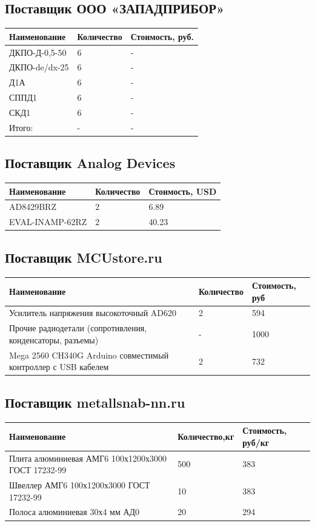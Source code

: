 \documentclass[11pt]{report}
\begin{document}
\subsection{Поставщик ООО «ЗАПАДПРИБОР»} 
\begin{tabular}{|p{5.5cm}|p{3.0cm}|p{3cm}|}
\hline
	Наименование & Количество & Стоимость, руб. \\
\hline
	ДКПО-Д-0,5-50  & 6 & - \\
\hline
	ДКПО-de/dx-25   & 6 & - \\
\hline	
	Д1А  & 6 & -\\
\hline
	СППД1  & 6 & -\\
\hline
	СКД1  & 6 & -\\
\hline
	Итого:  & - & - \\
\hline
\end{tabular}

\subsection{Поставщик Analog Devices} 
\begin{tabular}{|p{5.5cm}|p{3.0cm}|p{3cm}|}
\hline
	Наименование & Количество & Стоимость, USD \\
\hline
	AD8429BRZ  & 2 & 6.89 \\
\hline
	EVAL-INAMP-62RZ   & 2 & 40.23 \\
\hline	
\end{tabular}

\subsection{Поставщик MCUstore.ru} 
\begin{tabular}{|p{5.5cm}|p{3.0cm}|p{3cm}|}
\hline
	Наименование & Количество & Стоимость, руб \\
\hline
	Усилитель напряжения высокоточный AD620  & 2 & 594 \\
\hline
	Прочие радиодетали (сопротивления, конденсаторы, разъемы)   & - & 1000 \\
\hline	
	Mega 2560 CH340G Arduino совместимый контроллер с USB кабелем   & 2 & 732 \\
\hline	
\end{tabular}

\subsection{Поставщик metallsnab-nn.ru} 
\begin{tabular}{|p{5.5cm}|p{3.0cm}|p{3cm}|}
\hline
	Наименование & Количество,кг & Стоимость, руб/кг \\
\hline
	Плита алюминиевая АМГ6 100х1200х3000 ГОСТ 17232-99  & 500 & 383 \\
\hline
	Швеллер АМГ6 100х1200х3000 ГОСТ 17232-99  & 10 & 383 \\
\hline	
	Полоса алюминиевая 30х4 мм АД0   & 20 & 294 \\
\hline	
\end{tabular}
\end{document}
